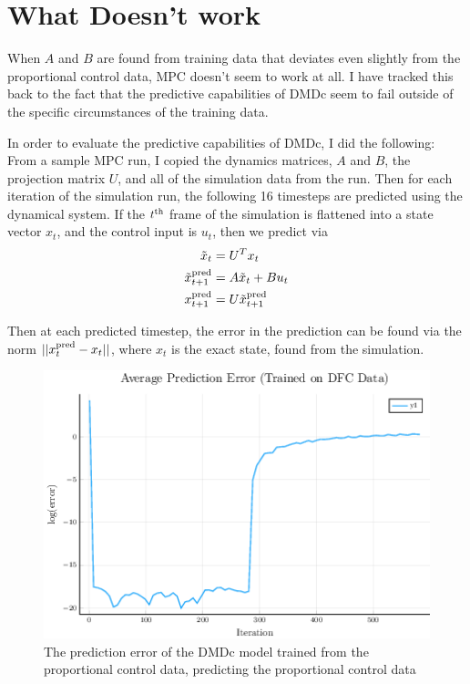 \documentclass{article}
\begin{document}
\section*{What Doesn't work}
When $A$ and $B$ are found from training data that deviates even slightly from the proportional control data, MPC doesn't seem to work at all. I have tracked this back to the fact that the predictive capabilities of DMDc seem to fail outside of the specific circumstances of the training data.

In order to evaluate the predictive capabilities of DMDc, I did the following:
From a sample MPC run, I copied the dynamics matrices, $A$ and $B$, the projection matrix $U$, and all of the simulation data from the run. Then for each iteration of the simulation run, the following 16 timesteps are predicted using the dynamical system. If the $t^{\rm th}$ frame of the simulation is flattened into a state vector $x_t$, and the control input is $u_t$, then we predict via
\begin{align*}
\tilde{x}_t &= U^T x_t \\
\tilde{x}^{\rm pred}_{t+1} &= A \tilde{x}_t + B u_t \\
x^{\rm pred}_{t+1} &= U \tilde{x}^{\rm pred}_{t+1}
\end{align*}

Then at each predicted timestep, the error in the prediction can be found via the norm $|| x^{\rm pred}_{t} - x_t ||$, where $x_t$ is the exact state, found from the simulation.



\begin{figure}
  \centering
  \includegraphics[scale=0.5]{../images/pred_error_working}
  \caption{The prediction error of the DMDc model trained from the proportional control data, predicting the proportional control data}
  \label{fig:pred_error_working}
\end{figure}
\end{document}
